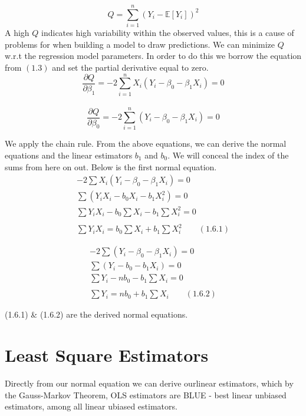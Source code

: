 \documentclass{article}
\begin{document}
\begin{equation} \tag{1.4.1}
		Q = \sum_{i=1}^n (Y_i - \mathbb{E}[Y_i])^2
\end{equation}
A high $Q$ indicates high variability within the observed values, this 
is a cause of problems for when building a model to draw predictions. We 
can minimize $Q$ w.r.t the regression model parameters. In order to do this
we borrow the equation from $(1.3)$ and set the partial derivative equal to
zero.
\begin{equation} \tag{1.5.1}
	\frac{\partial Q}{\partial \beta_1} = -2\sum_{i=1}^n X_i(Y_i - 
	\beta_0-\beta_1X_i) = 0
\end{equation} \\
\begin{equation} \tag{1.5.2}
\frac{\partial Q}{\partial \beta_0} = -2\sum_{i=1}^n (Y_i - 
	\beta_0-\beta_1X_i) = 0 
\end{equation}

\noindent We apply the chain rule. From the above equations, we can
derive the normal equations and the linear estimators $b_1$ and $b_0$. We
will conceal the index of the sums from here on out. Below is the first 
normal equation.
\begin{align*}
	  -2\sum X_i(Y_i - \beta_0-\beta_1X_i) = 0 \\
	 \sum (Y_iX_i - b_0X_i - b_1X_i^2) = 0  \\
	 \sum Y_iX_i - b_0\sum X_i - b_1\sum X_i^2 =  0  \\ \\
	\sum Y_iX_i = b_0\sum X_i + b_1 \sum X_i^2 \quad \quad (1.6.1)  
\end{align*}

\begin{align*}
	  -2\sum (Y_i - \beta_0-\beta_1X_i) = 0 \\
	 \sum (Y_i - b_0 - b_1X_i) = 0  \\
	 \sum Y_i - nb_0 - b_1\sum X_i =  0  \\ \\
	\sum Y_i = nb_0 + b_1 \sum X_i \quad \quad (1.6.2)  
\end{align*}

(1.6.1) & (1.6.2) are the derived normal equations.

\section{Least Square Estimators}

	Directly from our normal equation we can derive ourlinear estimators, 
	which by the Gauss-Markov Theorem, OLS estimators are BLUE - best linear 
	unbiased estimators, among all linear ubiased estimators. 
	
\end{document}
